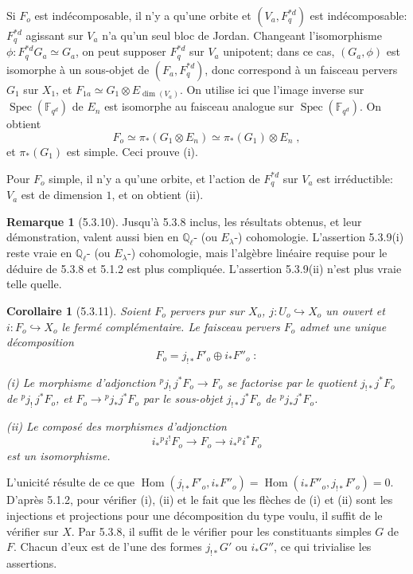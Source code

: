 \documentclass[12pt,a4paper]{article}
\theoremstyle{plain}
\newtheorem{corollary}[theorem]{Corollaire}
\theoremstyle{definition}
\newtheorem{remark}[theorem]{Remarque}
\theoremstyle{remark}
\DeclareMathOperator{\Hom}{Hom}
\DeclareMathOperator{\Spec}{Spec}
\newcommand{\FF}{\mathbb{F}}
\newcommand{\QQ}{\mathbb{Q}}
\begin{document}
Si $F_o$ est ind\'ecomposable, il n'y a qu'une orbite et $(V_a, F^{*d}_q)$ est ind\'ecomposable: $F^{*d}_q$ agissant sur $V_a$ n'a qu'un seul bloc de Jordan. Changeant l'isomorphisme $\phi: F^{*d}_q G_a \simeq G_a$, on peut supposer $F^{*d}_q$ sur $V_a$ unipotent; dans ce cas, $(G_a, \phi)$ est isomorphe \`a un sous-objet de $(F_a, F^{*d}_q)$, donc correspond \`a un faisceau pervers $G_1$ sur $X_1$, et $F_{1a} \simeq G_1 \otimes E_{\dim(V_a)}$. On utilise ici que l'image inverse sur $\Spec(\FF_{q^d})$ de $E_n$ est isomorphe au faisceau analogue sur $\Spec(\FF_{q^d})$. On obtient
\[
F_o \simeq \pi_*(G_1 \otimes E_n) \simeq \pi_*(G_1) \otimes E_n\;,
\]
et $\pi_*(G_1)$ est simple. Ceci prouve (i).

Pour $F_o$ simple, il n'y a qu'une orbite, et l'action de $F^{*d}_q$ sur $V_a$ est irr\'eductible: $V_a$ est de dimension $1$, et on obtient (ii).

\begin{remark}[5.3.10]
Jusqu'\`a 5.3.8 inclus, les r\'esultats obtenus, et leur d\'emonstration, valent aussi bien en $\QQ_{\ell}$- (ou $E_{\lambda}$-) cohomologie. L'assertion 5.3.9(i) reste vraie en $\QQ_{\ell}$- (ou $E_{\lambda}$-) cohomologie, mais l'alg\`ebre lin\'eaire requise pour le d\'eduire de 5.3.8 et 5.1.2 est plus compliqu\'ee. L'assertion 5.3.9(ii) n'est plus vraie telle quelle.
\end{remark}

\begin{corollary}[5.3.11]
Soient $F_o$ pervers pur sur $X_o$, $j: U_o \hookrightarrow X_o$ un ouvert et $i: F_o \hookrightarrow X_o$ le ferm\'e compl\'ementaire. Le faisceau pervers $F_o$ admet une unique d\'ecomposition
\[
F_o = j_{!*}F'_o \oplus i_*F''_o\;:
\]

\emph{(i)} Le morphisme d'adjonction ${}^{p}j_!\, j^*F_o \to F_o$ se factorise par le quotient $j_{!*}j^*F_o$ de ${}^{p}j_!\, j^*F_o$, et $F_o \to {}^{p}j_*j^*F_o$ par le sous-objet $j_{!*}j^*F_o$ de ${}^{p}j_*j^*F_o$.

\emph{(ii)} Le compos\'e des morphismes d'adjonction
\[
i_*{}^{p}i^!F_o \to F_o \to i_*{}^{p}i^*F_o
\]
est un isomorphisme.
\end{corollary}

L'unicit\'e r\'esulte de ce que $\Hom(j_{!*}F'_o, i_*F''_o) = \Hom(i_*F''_o, j_{!*}F'_o) = 0$. D'apr\`es 5.1.2, pour v\'erifier (i), (ii) et le fait que les fl\`eches de (i) et (ii) sont les injections et projections pour une d\'ecomposition du type voulu, il suffit de le v\'erifier sur $X$. Par 5.3.8, il suffit de le v\'erifier pour les constituants simples $G$ de $F$. Chacun d'eux est de l'une des formes $j_{!*}G'$ ou $i_*G''$, ce qui trivialise les assertions.
\end{document}
